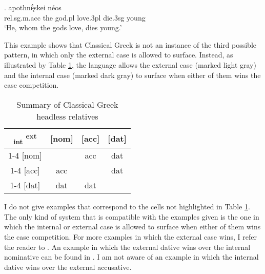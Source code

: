 \exg.     apothnḗͅskei néos\\
\ac{rel}.\ac{sg}.\ac{m}.\ac{acc} the god.\ac{pl} love.3\ac{pl}\scsub{[acc]} die.3\ac{sg}\scsub{[nom]} young\\
`He, whom the gods love, dies young.' \label{ex:ag-nom-acc}

This example shows that Classical Greek is not an instance of the third possible pattern, in which only the external case is allowed to surface. Instead, as illustrated by Table \ref{tbl:case-competition-classical-greek}, the language allows the external case (marked light gray) and the internal case (marked dark gray) to surface when either of them wins the case competition.

\begin{table}[H]
  \center
  \caption{Summary of Classical Greek headless relatives}
  \begin{tabular}{c|c|c|c}
    \toprule
    \textsubscript{\ac{int}} \textsuperscript{\ac{ext}}
           & [\ac{nom}]
           & [\ac{acc}]
           & [\ac{dat}]
           \\ \cmidrule{1-4}
       [\ac{nom}]
           & \xcancel{\phantom{xx}}
           & \ac{acc}
           & \ac{dat}
           \\ \cmidrule{1-4}
       [\ac{acc}]
           & \cellcolor{DG}\ac{acc}
           & \xcancel{\phantom{xx}}
           & \cellcolor{LG}\ac{dat}
           \\ \cmidrule{1-4}
       [\ac{dat}]
           & \ac{dat}
           & \ac{dat}
           & \xcancel{\phantom{xx}}
           \\
     \bottomrule
  \end{tabular}
    \label{tbl:case-competition-classical-greek}
\end{table}

I do not give examples that correspond to the cells not highlighted in Table \ref{tbl:case-competition-classical-greek}. The only kind of system that is compatible with the examples given is the one in which the internal or external case is allowed to surface when either of them wins the case competition. For more examples in which the external case wins, I refer the reader to . An example in which the external dative wins over the internal nominative can be found in \citet{noussia2015}. I am not aware of an example in which the internal dative wins over the external accusative.

